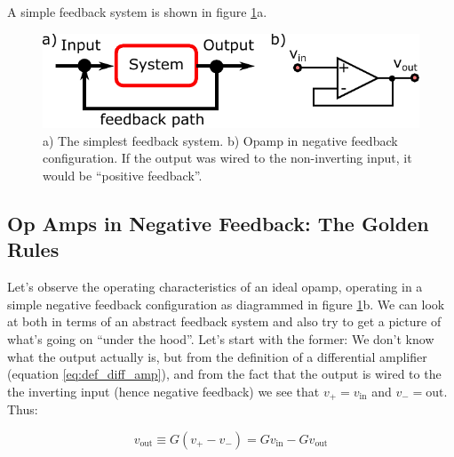 \documentclass[]{article}
\begin{document}
A simple feedback system is shown in figure \ref{fig:simple_feedback}a.

\begin{figure}[ht]
\caption{a) The simplest feedback system. b) Opamp in negative feedback configuration. If the output was wired to the non-inverting input, it would be ``positive feedback''.}
\label{fig:simple_feedback}
\begin{center}
\includegraphics[]{Images/simple_feedback.pdf}
\end{center}
\end{figure}

\subsection{Op Amps in Negative Feedback: The Golden Rules}
Let's observe the operating characteristics of an ideal opamp, operating in a simple negative feedback configuration as diagrammed in figure \ref{fig:simple_feedback}b. We can look at both in terms of an abstract feedback system and also try to get a picture of what's going on ``under the hood''. Let's start with the former: We don't know what the output actually is, but from the definition of a differential amplifier (equation \ref{eq:def_diff_amp}), and from the fact that the output is wired to the the inverting input (hence negative feedback) we see that $v_+ = v_\text{in}$ and $v_-=\text{out}$. Thus:

\begin{equation*}
v_\text{out} \equiv G\left(v_+ - v_-\right)  = Gv_\text{in} - Gv_\text{out}
\end{equation*}
\end{document}
